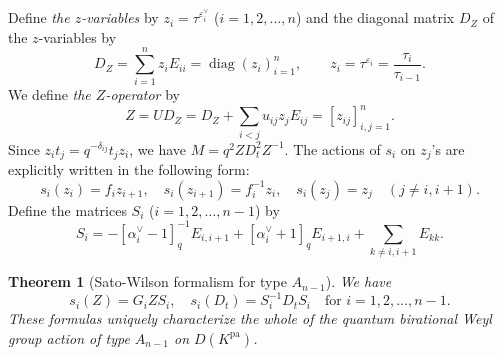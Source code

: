 \documentclass[12pt,twoside]{article}
\newcommand\av{\alpha^\vee}
\newcommand\eps{\varepsilon}
\newcommand\epsv{\eps^\vee}
\newcommand\pa{{\mathrm{pa}}}
\newcommand\diag{\mathop{\mathrm{diag}}\nolimits}
\theoremstyle{plain} %
\newtheorem{theorem}{Theorem}
\theoremstyle{definition} %
\theoremstyle{definition} %
\numberwithin{theorem}{section}
\numberwithin{equation}{section}
\numberwithin{figure}{section}
\numberwithin{table}{section}
\begin{document}
Define {\em the $z$-variables} by $z_i = \tau^{\epsv_i}$ ($i=1,2,\ldots,n$) 
and the diagonal matrix $D_Z$ of the $z$-variables by
\begin{equation*}
 D_Z = \sum_{i=1}^n z_i E_{ii} = \diag(z_i)_{i=1}^n,
 \qquad z_i = \tau^{\eps_i} = \frac{\tau_i}{\tau_{i-1}}.
\end{equation*}
We define {\em the $Z$-operator} by
\begin{equation*}
 Z = U D_Z = D_Z + \sum_{i<j} u_{ij}z_j E_{ij} = [z_{ij}]_{i,j=1}^n.
\end{equation*}
Since $z_i t_j = q^{-\delta_{ij}} t_j z_i$, 
we have $M = q^2 Z D_t^2 Z^{-1}$. 
The actions of $s_i$ on $z_j$'s are explicitly written in the following form:
\begin{equation}
 s_i(z_i)= f_i z_{i+1}, \quad
 s_i(z_{i+1}) = f_i^{-1} z_i, \quad
 s_i(z_j) = z_j \quad (j\ne i,i+1).
 \label{eq:s_i(z_j)}
\end{equation}
Define the matrices $S_i$ ($i=1,2,\ldots,n-1$) by
\begin{equation*}
 S_i = 
 -[\av_i-1]_q^{-1} E_{i,i+1} + [\av_i+1]_q E_{i+1,i}
 + \sum_{k\ne i,i+1} E_{kk}.
\end{equation*}

\begin{theorem}[Sato-Wilson formalism for type $A_{n-1}$]
\label{theorem:Sato-Wilson-A_{n-1}}
 We have
 \begin{equation}
  s_i(Z) = G_i Z S_i, \quad 
  s_i(D_t) = S_i^{-1} D_t S_i 
  \quad \text{for $i=1,2,\ldots,n-1$}.
  \label{eq:s_i(Z)}
 \end{equation}
 These formulas uniquely characterize the whole of 
 the quantum birational Weyl group action of type $A_{n-1}$
 on $D(K^\pa)$.
\end{theorem}
\end{document}

